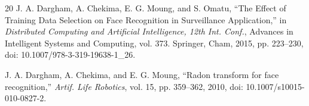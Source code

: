 \documentclass[conference]{IEEEtran}
\begin{document}
\begin{thebibliography}{20}
J. A. Dargham, A. Chekima, E. G. Moung, and S. Omatu, ``The Effect of Training Data Selection on Face Recognition in Surveillance Application,'' in \textit{Distributed Computing and Artificial Intelligence, 12th Int. Conf.}, Advances in Intelligent Systems and Computing, vol. 373. Springer, Cham, 2015, pp. 223--230, doi: 10.1007/978-3-319-19638-1\_26.

J. A. Dargham, A. Chekima, and E. G. Moung, ``Radon transform for face recognition,'' \textit{Artif. Life Robotics}, vol. 15, pp. 359--362, 2010, doi: 10.1007/s10015-010-0827-2.

\end{thebibliography}
\end{document}
